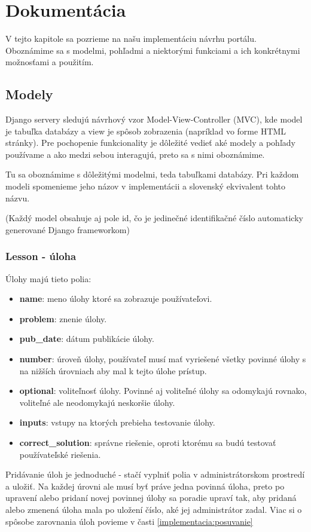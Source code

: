 \chapter{Dokumentácia}
\label{kap:doc}
V tejto kapitole sa pozrieme na našu implementáciu návrhu portálu. Oboznámime sa
s modelmi, pohľadmi a niektorými funkciami a ich konkrétnymi možnosťami a použitím.
\section{Modely}
\label{modely}
Django servery sledujú návrhový vzor Model-View-Controller (MVC), kde model je tabuľka
databázy a view je spôsob zobrazenia (napríklad vo forme HTML stránky). Pre pochopenie
funkcionality je dôležité vedieť aké modely a pohľady používame a ako medzi sebou interagujú,
preto sa s nimi oboznámime.

Tu sa oboznámime s dôležitými modelmi, teda tabuľkami databázy.
Pri každom modeli spomenieme jeho názov v implementácii a slovenský ekvivalent tohto názvu.

(Každý model obsahuje aj pole id, čo je jedinečné identifikačné číslo automaticky generované
Django frameworkom)
\subsection{Lesson - úloha}
\label{doc:lesson}
Úlohy majú tieto polia:
\begin{itemize}
\itemsep0em
\item \textbf{name}: meno úlohy ktoré sa zobrazuje používateľovi.
\item \textbf{problem}: znenie úlohy.
\item \textbf{pub\_date}: dátum publikácie úlohy.
\item \textbf{number}: úroveň úlohy, používateľ musí mať vyriešené všetky povinné úlohy s
  na nižších úrovniach aby mal k tejto úlohe prístup.
\item \textbf{optional}: voliteľnosť úlohy. Povinné aj voliteľné úlohy sa odomykajú rovnako, voliteľné
   ale neodomykajú neskoršie úlohy.
\item \textbf{inputs}: vstupy na ktorých prebieha testovanie úlohy.
\item \textbf{correct\_solution}: správne riešenie, oproti ktorému sa budú testovať používateľské
   riešenia.
\end{itemize}

Pridávanie úloh je jednoduché - stačí vyplniť polia v administrátorskom prostredí
a uložiť. Na každej úrovni ale musí byť práve jedna povinná úloha, preto po upravení
alebo pridaní novej povinnej úlohy sa poradie upraví tak, aby pridaná alebo zmenená úloha mala
po uložení číslo, aké jej administrátor zadal. Viac si o spôsobe zarovnania úloh povieme v časti
\ref{implementacia:posuvanie}

